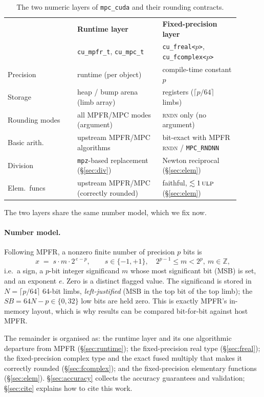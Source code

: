 \documentclass[11pt,a4paper]{article}
\newcommand{\code}[1]{\texttt{#1}}
\newcommand{\PB}{\ensuremath{p}}
\newcommand{\Nlimb}{\ensuremath{N}}
\newcommand{\ulp}{\textsc{ulp}}
\newcommand{\rndn}{\textsc{rndn}}
\begin{document}
\begin{table}[h]
\centering
\begin{tabular}{@{}p{0.27\linewidth}p{0.33\linewidth}p{0.30\linewidth}@{}}
\toprule
 & \textbf{Runtime layer} & \textbf{Fixed-precision layer}\\
 & \code{cu\_mpfr\_t}, \code{cu\_mpc\_t} & \code{cu\_freal<\PB>}, \code{cu\_fcomplex<\PB>}\\
\midrule
Precision      & runtime (per object) & compile-time constant \PB\\
Storage        & heap / bump arena (limb array) & registers ($\lceil \PB/64\rceil$ limbs)\\
Rounding modes & all MPFR/MPC modes (argument) & \rndn{} only (no argument)\\
Basic arith.   & upstream MPFR/MPC algorithms & bit-exact with MPFR \rndn{} / \code{MPC\_RNDNN}\\
Division       & \code{mpz}-based replacement (\S\ref{sec:div}) & Newton reciprocal (\S\ref{sec:elem})\\
Elem.\ funcs   & upstream MPFR/MPC (correctly rounded) & faithful, $\lesssim 1\,\ulp$ (\S\ref{sec:elem})\\
\bottomrule
\end{tabular}
\caption{The two numeric layers of \code{mpc\_cuda} and their rounding contracts.}
\label{tab:layers}
\end{table}

The two layers share the same number model, which we fix now.

\paragraph{Number model.}
Following MPFR, a nonzero finite number of precision \PB{} bits is
\begin{equation}
x \;=\; s \cdot m \cdot 2^{\,e-\PB},
\qquad s\in\{-1,+1\},\quad 2^{\PB-1}\le m < 2^{\PB},\ m\in\mathbb{Z},
\label{eq:model}
\end{equation}
i.e.\ a sign, a \PB-bit integer significand $m$ whose most significant bit (MSB)
is set, and an exponent $e$. Zero is a distinct flagged value. The significand
is stored in $\Nlimb=\lceil \PB/64\rceil$ 64-bit limbs, \emph{left-justified}
(MSB in the top bit of the top limb); the $\mathit{SB}=64\Nlimb-\PB\in\{0,32\}$
low bits are held zero. This is exactly MPFR's in-memory layout, which is why
results can be compared bit-for-bit against host MPFR.

\medskip
\noindent
The remainder is organised as: the runtime layer and its one algorithmic
departure from MPFR (\S\ref{sec:runtime}); the fixed-precision real type
(\S\ref{sec:freal}); the fixed-precision complex type and the exact fused
multiply that makes it correctly rounded (\S\ref{sec:fcomplex}); and the
fixed-precision elementary functions (\S\ref{sec:elem}). \S\ref{sec:accuracy}
collects the accuracy guarantees and validation; \S\ref{sec:cite} explains how to
cite this work.
\end{document}
